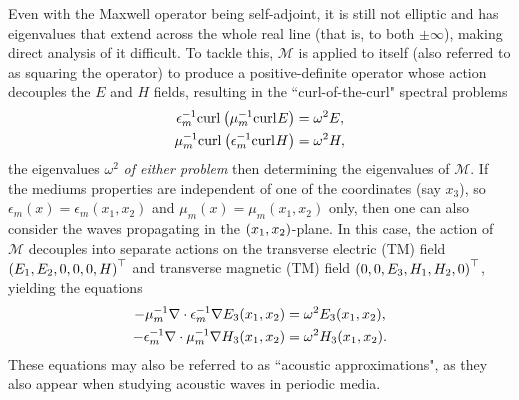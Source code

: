 Even with the Maxwell operator being self-adjoint, it is still not elliptic and has eigenvalues that extend across the whole real line (that is, to both $\pm\infty$), making direct analysis of it difficult.
To tackle this, $\mathcal{M}$ is applied to itself (also referred to as squaring the operator) to produce a positive-definite operator whose action decouples the $E$ and $H$ fields, resulting in the ``curl-of-the-curl" spectral problems
\begin{subequations} \label{eq:Intro-CurlCurlEqns}
	\begin{align}
		\epsilon_m^{-1}\mathrm{curl}_{}\left( \mu_m^{-1}\mathrm{curl}_{}E \right) &= \omega^2 E, \\
		\mu_m^{-1}\mathrm{curl}_{}\left( \epsilon_m^{-1}\mathrm{curl}_{}H \right) &= \omega^2 H,
	\end{align}
\end{subequations}
the eigenvalues $\omega^2$ \emph{of either problem} then determining the eigenvalues of $\mathcal{M}$.
If the mediums properties are independent of one of the coordinates (say $x_3$), so $\epsilon_m(x)=\epsilon_m(x_1,x_2)$ and $\mu_m(x)=\mu_m(x_1,x_2)$ only, then one can also consider the waves propagating in the $\left( x_1,x_2 \right)$-plane.
In this case, the action of $\mathcal{M}$ decouples into separate actions on the transverse electric (TM) field $\left( E_1,E_2,0,0,0,H \right)^\top$ and transverse magnetic (TM) field $\left( 0,0,E_3,H_1,H_2,0 \right)^\top$, yielding the equations
\begin{subequations} \label{eq:Intro-AcousticApprox}
	\begin{align}
		-\mu_m^{-1}\nabla\cdot\epsilon_m^{-1}\nabla E_3(x_1,x_2) &= \omega^2 E_3(x_1,x_2), \\
		-\epsilon_m^{-1}\nabla\cdot\mu_m^{-1}\nabla H_3(x_1,x_2) &= \omega^2 H_3(x_1,x_2).
	\end{align}
\end{subequations}
These equations may also be referred to as ``acoustic approximations", as they also appear when studying acoustic waves in periodic media.


